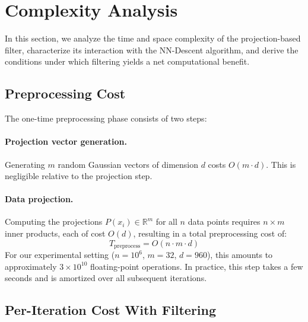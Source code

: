 





\section{Complexity Analysis}
\label{sec:analysis}

In this section, we analyze the time and space complexity of the projection-based filter, characterize its interaction with the NN-Descent algorithm, and derive the conditions under which filtering yields a net computational benefit.

\subsection{Preprocessing Cost}
\label{sec:preprocessing}

The one-time preprocessing phase consists of two steps:

\paragraph{Projection vector generation.}
Generating $m$ random Gaussian vectors of dimension $d$ costs $O(m \cdot d)$.
This is negligible relative to the projection step.

\paragraph{Data projection.}
Computing the projections $P(x_i) \in \mathbb{R}^m$ for all $n$ data points requires $n \times m$ inner products, each of cost $O(d)$, resulting in a total preprocessing cost of:
\begin{equation}
    T_{\text{preprocess}} = O(n \cdot m \cdot d)
    \label{eq:preprocess}
\end{equation}
For our experimental setting ($n = 10^6$, $m = 32$, $d = 960$), this amounts to approximately $3 \times 10^{10}$ floating-point operations.
In practice, this step takes a few seconds and is amortized over all subsequent iterations.

\subsection{Per-Iteration Cost With Filtering}
\label{sec:per_iteration}

